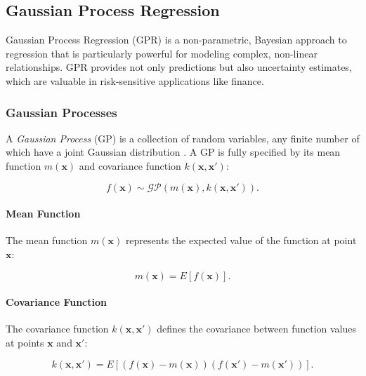 \subsection{Gaussian Process Regression}

Gaussian Process Regression (GPR) is a non-parametric, Bayesian approach to regression that is particularly powerful for modeling complex, non-linear relationships. GPR provides not only predictions but also uncertainty estimates, which are valuable in risk-sensitive applications like finance.

\subsubsection{Gaussian Processes}

A \textit{Gaussian Process} (GP) is a collection of random variables, any finite number of which have a joint Gaussian distribution \cite{rasmussen2006gaussian}. A GP is fully specified by its mean function $m(\mathbf{x})$ and covariance function $k(\mathbf{x}, \mathbf{x}')$:

\begin{equation}
    f(\mathbf{x}) \sim \mathcal{GP}\left( m(\mathbf{x}), k(\mathbf{x}, \mathbf{x}') \right).
\end{equation}

\paragraph{Mean Function}

The mean function $m(\mathbf{x})$ represents the expected value of the function at point $\mathbf{x}$:

\begin{equation}
    m(\mathbf{x}) = E[f(\mathbf{x})].
\end{equation}

\paragraph{Covariance Function}

The covariance function $k(\mathbf{x}, \mathbf{x}')$ defines the covariance between function values at points $\mathbf{x}$ and $\mathbf{x}'$:

\begin{equation}
    k(\mathbf{x}, \mathbf{x}') = E\left[ (f(\mathbf{x}) - m(\mathbf{x}))(f(\mathbf{x}') - m(\mathbf{x}')) \right].
\end{equation}

